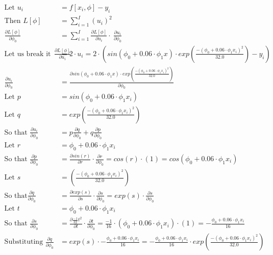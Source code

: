 \documentclass{article}
\begin{document}
\begin{align*}
\text{Let } u_i &= f[x_i, \phi]-y_i \\
\text{Then } L [\phi] &= \sum_{i=1}^{I} (u_i)^2 \\
\frac{\partial{L[\phi]}}{\partial{\phi_0}} &= \sum_{i=1}^{I}  \frac{\partial{L[\phi]}}{\partial{u_i}} \cdot \
 \frac{\partial{u_i}}{\partial{\phi_0}}
 \\
 \text{Let us break it down } \frac{\partial{L[\phi]}}{\partial{u_i}} &= 2 \cdot u_i = 2 \cdot \left( sin(\phi_0 + 0.06 \cdot \phi_1x) \cdot exp  \left( \frac{-(\phi_0 + 0.06 \cdot \phi_1x_i)^2}{32.0} \right) - y_i \right)
 \\
 \frac{\partial{u_i}}{\partial{\phi_0}} &= \frac{\partial{sin(\phi_0 + 0.06 \cdot \phi_1x) \cdot exp  \left( \frac{-(\phi_0 + 0.06 \cdot \phi_1x_i)^2}{32.0} \right)}}{\partial{\phi_0}} \\
 \text{Let } p &= sin(\phi_0 + 0.06 \cdot \phi_1x_i) \\
 \text{Let } q &= exp  \left( \frac{-(\phi_0 + 0.06 \cdot \phi_1x_i)^2}{32.0} \right) \\
 \text{So that } \frac{\partial{u_i}}{\partial{\phi_0}} &= p\frac{\partial{q}}{\partial{\phi_0}} + q \frac{\partial{p}}{\partial{\phi_0}}
 \\
 \text{Let } r &= \phi_0 + 0.06 \cdot \phi_1 x_i
 \\
 \text{So that } \frac{\partial{p}}{\partial{\phi_0}} &= \frac{\partial{sin(r)}}{\partial{r}} \cdot \frac{\partial{r}}{\partial{\phi_0}} = cos (r) \cdot (1) = cos(\phi_0 + 0.06\cdot \phi_1 x_i)
 \\
 \text{Let } s &= \left( \frac{-(\phi_0 + 0.06 \cdot \phi_1x_i)^2}{32.0} \right)
 \\
 \text{So that} \frac{\partial{q}}{\partial{\phi_0}} &= \frac{\partial{exp(s)}}{\partial{s}} \cdot \frac{\partial{s}}{\partial{\phi_0}} = exp(s) \cdot \frac{\partial{s}}{\partial{\phi_0}}
 \\
 \text{Let }t &= \phi_0 + 0.06 \cdot \phi_1x_i
 \\
 \text{So that } \frac{\partial{s}}{\partial{\phi_0}} &= \frac{\partial{\frac{-1}{32}}t^2}{\partial{t}} \cdot \frac{\partial{t}}{\partial{\phi_0}} = \frac{-1}{16} \cdot ( \phi_0 + 0.06 \cdot \phi_1x_i ) \cdot (1) = -\frac{\phi_0 + 0.06 \cdot \phi_1x_i}{16}
 \\
 \text{Substituting } \frac{\partial{q}}{\partial{\phi_0}} &= exp(s) \cdot  -\frac{\phi_0 + 0.06 \cdot \phi_1x_i}{16} = -\frac{\phi_0 + 0.06 \cdot \phi_1x_i}{16} \cdot exp \left( \frac{-(\phi_0 + 0.06 \cdot \phi_1x_i)^2}{32.0} \right)

\end{align*}
\end{document}
